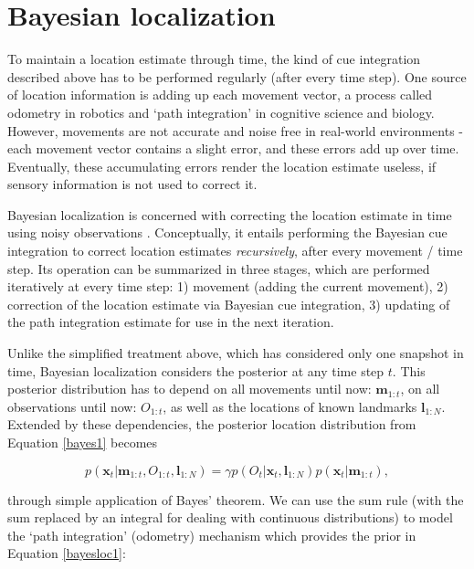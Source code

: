 %
\section{Bayesian localization}
\label{sec:bayesloc}

To maintain a location estimate through time, the kind of cue integration described above has to be performed regularly (after every time step). One source of location information is adding up each movement vector, a process called odometry in robotics and `path integration' in cognitive science and biology. However, movements are not accurate and noise free in real-world environments - each movement vector contains a slight error, and these errors add up over time. Eventually, these accumulating errors render the location estimate useless, if sensory information is not used to correct it. 

Bayesian localization is concerned with correcting the location estimate in time using noisy observations \citep{thrun2005probabilistic}. Conceptually, it entails performing the Bayesian cue integration to correct location estimates \textit{recursively}, after every movement / time step. Its operation can be summarized in three stages, which are performed iteratively at every time step: 1) movement (adding the current movement), 2) correction of the location estimate via Bayesian cue integration, 3) updating of the path integration estimate for use in the next iteration.

Unlike the simplified treatment above, which has considered only one snapshot in time, Bayesian localization considers the posterior at any time step $t$. This posterior distribution has to depend on all movements until now: $\bm m_{1:t}$, on all observations until now: $ O_{1:t}$, as well as the locations of known landmarks $\bm l_{1:N}$. Extended by these dependencies, the posterior location distribution from Equation \ref{bayes1} becomes


\begin{equation}
\label{bayesloc1}
p(\bm x_{t} | \bm m_{1:t}, O_{1:t}, \bm l_{1:N}) = \gamma p(O_{t} | \bm x_{t}, \bm l_{1:N}) p(\bm x_{t} | \bm m_{1:t}),
\end{equation}

through simple application of Bayes' theorem. We can use the sum rule (with the sum replaced by an integral for dealing with continuous distributions) to model the `path integration' (odometry) mechanism which provides the prior in Equation \ref{bayesloc1}:

